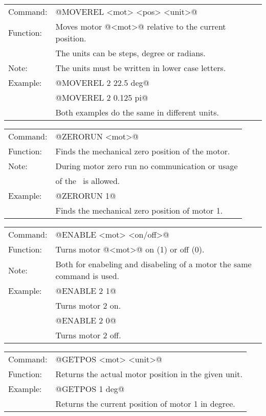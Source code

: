 \begin{tabular}{ll}
Command: & @MOVEREL <mot> <pos> <unit>@\\
Function: & Moves motor @<mot>@ relative to the current position.\\
		& The units can be steps, degree or radians.\\
Note: & The units must be written in lower case letters.\\
Example: & @MOVEREL 2 22.5 deg@\\
		& @MOVEREL 2 0.125 pi@\\
		& Both examples do the same in different units.
\end{tabular}

\vspace{\vdistace}

\begin{tabular}{ll}
Command: & @ZERORUN <mot>@\\
Function: & Finds the mechanical zero position of the motor.\\
Note: & During motor zero run no communication or usage\\
		& of the \productName ~is allowed.\\
Example: & @ZERORUN 1@\\
		& Finds the mechanical zero position of motor 1.
\end{tabular}

\vspace{\vdistace}

\begin{tabular}{ll}
Command: & @ENABLE <mot> <on/off>@\\
Function: & Turns motor @<mot>@ on (1) or off (0).\\
Note: & Both for enabeling and disabeling of a motor the same command is used.\\
Example: & @ENABLE 2 1@\\
		& Turns motor 2 on.\\
		& @ENABLE 2 0@\\
		& Turns motor 2 off.
\end{tabular}

\vspace{\vdistace}

\begin{tabular}{ll}
Command: & @GETPOS <mot> <unit>@\\
Function: & Returns the actual motor position in the given unit.\\
Example: & @GETPOS 1 deg@\\
		& Returns the current position of motor 1 in degree.
\end{tabular}

